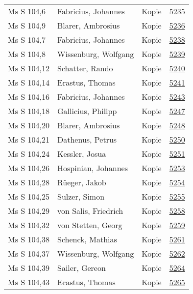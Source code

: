 \documentclass[10pt,a4paper,landscape]{report}
\begin{document}
\begin{longtable}{p{16cm}p{4cm}lr}
Ms S 104,6	&	Fabricius, Johannes	&	Kopie	&	\href{http://130.60.24.72/assignment/5235}{5235}\\
Ms S 104,9	&	Blarer, Ambrosius	&	Kopie	&	\href{http://130.60.24.72/assignment/5236}{5236}\\
Ms S 104,7	&	Fabricius, Johannes	&	Kopie	&	\href{http://130.60.24.72/assignment/5238}{5238}\\
Ms S 104,8	&	Wissenburg, Wolfgang	&	Kopie	&	\href{http://130.60.24.72/assignment/5239}{5239}\\
Ms S 104,12	&	Schatter, Rando	&	Kopie	&	\href{http://130.60.24.72/assignment/5240}{5240}\\
Ms S 104,14	&	Erastus, Thomas	&	Kopie	&	\href{http://130.60.24.72/assignment/5241}{5241}\\
Ms S 104,16	&	Fabricius, Johannes	&	Kopie	&	\href{http://130.60.24.72/assignment/5243}{5243}\\
Ms S 104,18	&	Gallicius, Philipp	&	Kopie	&	\href{http://130.60.24.72/assignment/5247}{5247}\\
Ms S 104,20	&	Blarer, Ambrosius	&	Kopie	&	\href{http://130.60.24.72/assignment/5248}{5248}\\
Ms S 104,21	&	Dathenus, Petrus	&	Kopie	&	\href{http://130.60.24.72/assignment/5250}{5250}\\
Ms S 104,24	&	Kessler, Josua	&	Kopie	&	\href{http://130.60.24.72/assignment/5251}{5251}\\
Ms S 104,26	&	Hospinian, Johannes	&	Kopie	&	\href{http://130.60.24.72/assignment/5253}{5253}\\
Ms S 104,28	&	Rüeger, Jakob	&	Kopie	&	\href{http://130.60.24.72/assignment/5254}{5254}\\
Ms S 104,25	&	Sulzer, Simon	&	Kopie	&	\href{http://130.60.24.72/assignment/5255}{5255}\\
Ms S 104,29	&	von Salis, Friedrich	&	Kopie	&	\href{http://130.60.24.72/assignment/5258}{5258}\\
Ms S 104,32	&	von Stetten, Georg	&	Kopie	&	\href{http://130.60.24.72/assignment/5259}{5259}\\
Ms S 104,38	&	Schenck, Mathias	&	Kopie	&	\href{http://130.60.24.72/assignment/5261}{5261}\\
Ms S 104,37	&	Wissenburg, Wolfgang	&	Kopie	&	\href{http://130.60.24.72/assignment/5262}{5262}\\
Ms S 104,39	&	Sailer, Gereon	&	Kopie	&	\href{http://130.60.24.72/assignment/5264}{5264}\\
Ms S 104,43	&	Erastus, Thomas	&	Kopie	&	\href{http://130.60.24.72/assignment/5265}{5265}\\

\end{longtable}
\end{document}
